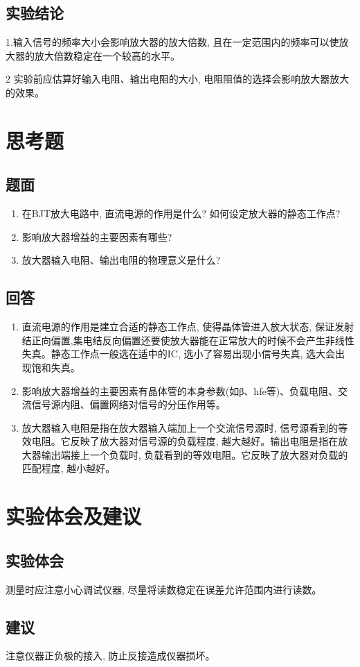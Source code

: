 \documentclass[10pt, a4paper]{article} %
\begin{document}
\subsection{实验结论}

1.输入信号的频率大小会影响放大器的放大倍数, 且在一定范围内的频率可以使放大器的放大倍数稳定在一个较高的水平。

2 实验前应估算好输入电阻、输出电阻的大小, 电阻阻值的选择会影响放大器放大的效果。

\section{思考题}
\subsection{题面}
\begin{enumerate}[leftmargin=50pt,label=(\arabic*)] %
    \item 在BJT放大电路中, 直流电源的作用是什么? 如何设定放大器的静态工作点? 
    \item 影响放大器增益的主要因素有哪些? 
    \item 放大器输入电阻、输出电阻的物理意义是什么? 

\end{enumerate}
\subsection{回答}

\begin{enumerate}[leftmargin=50pt,label=(\arabic*)] %
    \item 直流电源的作用是建立合适的静态工作点, 使得晶体管进入放大状态, 保证发射结正向偏置,集电结反向偏置还要使放大器能在正常放大的时候不会产生非线性失真。静态工作点一般选在适中的IC, 选小了容易出现小信号失真, 选大会出现饱和失真。
    \item 影响放大器增益的主要因素有晶体管的本身参数(如β、hfe等)、负载电阻、交流信号源内阻、偏置网络对信号的分压作用等。
    \item 放大器输入电阻是指在放大器输入端加上一个交流信号源时, 信号源看到的等效电阻。它反映了放大器对信号源的负载程度, 越大越好。输出电阻是指在放大器输出端接上一个负载时, 负载看到的等效电阻。它反映了放大器对负载的匹配程度, 越小越好。
\end{enumerate}

\section{实验体会及建议}
\subsection{实验体会}
测量时应注意小心调试仪器, 尽量将读数稳定在误差允许范围内进行读数。
\subsection{建议}
注意仪器正负极的接入, 防止反接造成仪器损坏。
\end{document}
